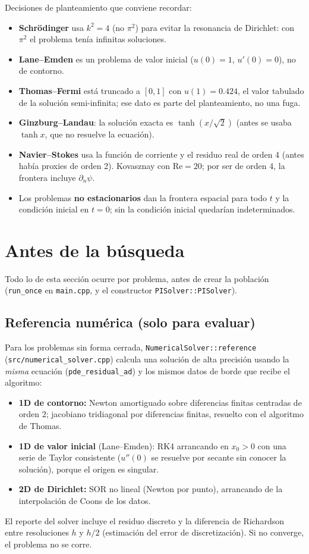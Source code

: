 \documentclass[11pt,a4paper]{article}
\newcommand{\code}[1]{\texttt{\small #1}}
\begin{document}
Decisiones de planteamiento que conviene recordar:
\begin{itemize}
\item \textbf{Schrödinger} usa $k^2=4$ (no $\pi^2$) para evitar la resonancia de Dirichlet: con $\pi^2$
  el problema tenía infinitas soluciones.
\item \textbf{Lane--Emden} es un problema de valor inicial ($u(0)=1$, $u'(0)=0$), no de contorno.
\item \textbf{Thomas--Fermi} está truncado a $[0,1]$ con $u(1)=0.424$, el valor tabulado de la solución
  semi-infinita; ese dato es parte del planteamiento, no una fuga.
\item \textbf{Ginzburg--Landau}: la solución exacta es $\tanh(x/\sqrt2)$ (antes se usaba $\tanh x$, que
  no resuelve la ecuación).
\item \textbf{Navier--Stokes} usa la función de corriente y el residuo real de orden 4 (antes había
  proxies de orden 2). Kovasznay con $\mathrm{Re}=20$; por ser de orden 4, la frontera incluye
  $\partial_n\psi$.
\item Los problemas \textbf{no estacionarios} dan la frontera espacial para todo $t$ y la condición
  inicial en $t=0$; sin la condición inicial quedarían indeterminados.
\end{itemize}

\section{Antes de la búsqueda}
Todo lo de esta sección ocurre por problema, antes de crear la población (\code{run\_once} en
\code{main.cpp}, y el constructor \code{PISolver::PISolver}).

\subsection{Referencia numérica (solo para evaluar)}
Para los problemas sin forma cerrada, \code{NumericalSolver::reference} (\code{src/numerical\_solver.cpp})
calcula una solución de alta precisión usando la \emph{misma} ecuación (\code{pde\_residual\_ad}) y los
mismos datos de borde que recibe el algoritmo:
\begin{itemize}
\item \textbf{1D de contorno:} Newton amortiguado sobre diferencias finitas centradas de orden 2;
  jacobiano tridiagonal por diferencias finitas, resuelto con el algoritmo de Thomas.
\item \textbf{1D de valor inicial} (Lane--Emden): RK4 arrancando en $x_0>0$ con una serie de Taylor
  consistente ($u''(0)$ se resuelve por secante sin conocer la solución), porque el origen es singular.
\item \textbf{2D de Dirichlet:} SOR no lineal (Newton por punto), arrancando de la interpolación de
  Coons de los datos.
\end{itemize}
El reporte del solver incluye el residuo discreto y la diferencia de Richardson entre resoluciones $h$
y $h/2$ (estimación del error de discretización). Si no converge, el problema no se corre.
\end{document}
